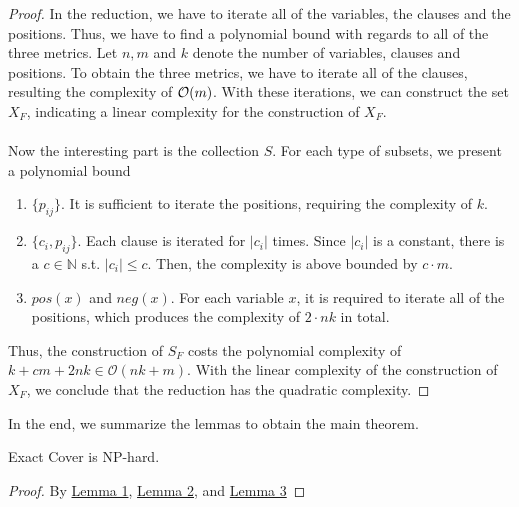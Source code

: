 \begin{proof}
    In the reduction, we have to iterate all of the variables, the clauses and the positions. 
    Thus, we have to find a polynomial bound with regards to all of the three metrics. Let $n, m$ and $k$ denote 
    the number of variables, clauses and positions. To obtain the three metrics, we have to iterate 
    all of the clauses, resulting the complexity of $\mathcal{O}({m})$. With these iterations, we can construct the set $X_F$,
    indicating a linear complexity for the construction of $X_F$. \\\\
    Now the interesting part is the collection $S$. For each type of subsets, we present a polynomial bound 
\begin{enumerate}
    \item $\{p_{ij}\}$. It is sufficient to iterate the positions, requiring the complexity of $k$.
    \item $\{c_i, p_{ij}\}$. Each clause is iterated for $|c_i|$ times. Since $|c_i|$ is a constant, there is a $c \in \mathbb{N}$ 
    s.t. $|c_i| \leq c$. Then, the complexity is above bounded by $c \cdot m$.
    \item $pos(x)$ and $neg(x)$. For each variable $x$, it is required to iterate all of the positions, which produces the complexity 
    of $2 \cdot nk$ in total.
\end{enumerate}
Thus, the construction of $S_F$ costs the polynomial complexity of $k + cm + 2nk \in \mathcal{O}(nk + m)$. 
With the linear complexity of the construction of $X_F$, we conclude that the reduction has the quadratic complexity.
\end{proof}
In the end, we summarize the lemmas to obtain the main theorem.
\begin{theorem}
    Exact Cover is NP-hard.
\end{theorem}
\begin{proof}
    By \hyperref[lemma:1]{Lemma 1}, \hyperref[lemma:2]{Lemma 2}, and \hyperref[lemma:3]{Lemma 3}
\end{proof}

